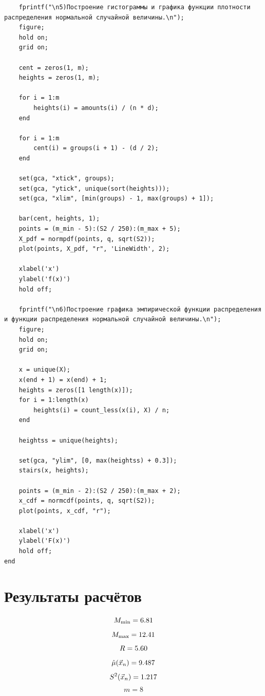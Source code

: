 \documentclass[12pt]{report}
\begin{document}
\begin{lstlisting}
    fprintf("\n5)Построение гистограммы и графика функции плотности распределения нормальной случайной величины.\n");
    figure;
    hold on;
    grid on;

    cent = zeros(1, m);
    heights = zeros(1, m);

    for i = 1:m
        heights(i) = amounts(i) / (n * d);
    end

    for i = 1:m
        cent(i) = groups(i + 1) - (d / 2);
    end

    set(gca, "xtick", groups);
    set(gca, "ytick", unique(sort(heights)));
    set(gca, "xlim", [min(groups) - 1, max(groups) + 1]);

    bar(cent, heights, 1);
    points = (m_min - 5):(S2 / 250):(m_max + 5);
    X_pdf = normpdf(points, q, sqrt(S2));
    plot(points, X_pdf, "r", 'LineWidth', 2);

    xlabel('x')
    ylabel('f(x)')
    hold off;

    fprintf("\n6)Построение графика эмпирической функции распределения и функции распределения нормальной случайной величины.\n");
    figure;
    hold on;
    grid on;

    x = unique(X);
    x(end + 1) = x(end) + 1;
    heights = zeros([1 length(x)]);
    for i = 1:length(x)
        heights(i) = count_less(x(i), X) / n;
    end

    heightss = unique(heights);

    set(gca, "ylim", [0, max(heightss) + 0.3]);
    stairs(x, heights);

    points = (m_min - 2):(S2 / 250):(m_max + 2);
    x_cdf = normcdf(points, q, sqrt(S2));
    plot(points, x_cdf, "r");

    xlabel('x')
    ylabel('F(x)')
    hold off;
end

\end{lstlisting}

\section{Результаты расчётов}

\begin{equation*}
M_{\min} = 6.81 \\
\end{equation*}
\begin{equation*}
M_{\max} = 12.41 \\
\end{equation*}
\begin{equation*}
    R = 5.60 \\
\end{equation*}
\begin{equation*}
    \hat\mu(\vec x_n) = 9.487 \\
\end{equation*}
\begin{equation*}
    S^2(\vec x_n) = 1.217 \\
\end{equation*}
\begin{equation*}
    m = 8
\end{equation*}
\end{document}
